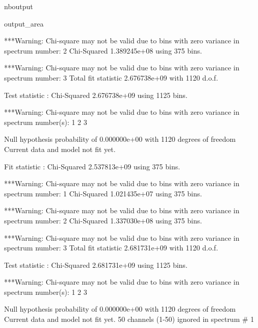 \documentclass[letterpaper,10pt,english]{sphinxmanual}
\begin{document}
\begin{sphinxuseclass}{nboutput}
{\begin{sphinxuseclass}{output_area}
\begin{sphinxuseclass}{}
\begin{sphinxVerbatim}[commandchars=\\\{\}]
***Warning: Chi-square may not be valid due to bins with zero variance
            in spectrum number: 2
                 Chi-Squared              1.389245e+08     using 375 bins.

***Warning: Chi-square may not be valid due to bins with zero variance
            in spectrum number: 3
Total fit statistic                       2.676738e+09     with 1120 d.o.f.

Test statistic : Chi-Squared              2.676738e+09     using 1125 bins.

***Warning: Chi-square may not be valid due to bins with zero variance
            in spectrum number(s): 1 2 3

 Null hypothesis probability of 0.000000e+00 with 1120 degrees of freedom
 Current data and model not fit yet.

Fit statistic  : Chi-Squared              2.537813e+09     using 375 bins.

***Warning: Chi-square may not be valid due to bins with zero variance
            in spectrum number: 1
                 Chi-Squared              1.021435e+07     using 375 bins.

***Warning: Chi-square may not be valid due to bins with zero variance
            in spectrum number: 2
                 Chi-Squared              1.337030e+08     using 375 bins.

***Warning: Chi-square may not be valid due to bins with zero variance
            in spectrum number: 3
Total fit statistic                       2.681731e+09     with 1120 d.o.f.

Test statistic : Chi-Squared              2.681731e+09     using 1125 bins.

***Warning: Chi-square may not be valid due to bins with zero variance
            in spectrum number(s): 1 2 3

 Null hypothesis probability of 0.000000e+00 with 1120 degrees of freedom
 Current data and model not fit yet.
    50 channels (1-50) ignored in spectrum \#     1
\end{sphinxVerbatim}



\end{sphinxuseclass}
\end{sphinxuseclass}
}

\end{sphinxuseclass}
\end{document}

